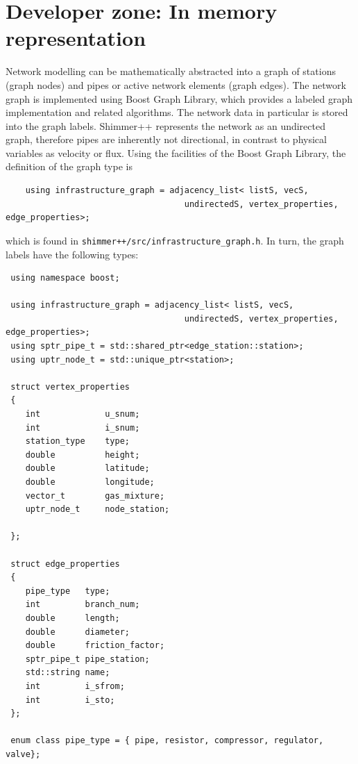 \section{Developer zone: In memory representation}
Network modelling can be mathematically abstracted into a graph of stations (graph nodes) and pipes or active network elements (graph edges). The network graph is implemented using Boost Graph Library, which provides a labeled graph implementation and related algorithms. The network data in particular is stored into the graph labels. Shimmer++ represents the network as an undirected graph, therefore pipes are inherently not directional, in contrast to physical variables as velocity or flux. Using the facilities of the Boost Graph Library, the definition of the graph type is
\begin{verbatim}
    using infrastructure_graph = adjacency_list< listS, vecS,
                                    undirectedS, vertex_properties, edge_properties>;    
\end{verbatim}    
which is found in \texttt{shimmer++/src/infrastructure\_graph.h}. In turn, the graph
labels have the following types:
\begin{verbatim}
 using namespace boost;

 using infrastructure_graph = adjacency_list< listS, vecS,
                                    undirectedS, vertex_properties, edge_properties>;
 using sptr_pipe_t = std::shared_ptr<edge_station::station>; 
 using uptr_node_t = std::unique_ptr<station>;
 
 struct vertex_properties                       
 {                                              
    int             u_snum;                     
    int             i_snum;                     
    station_type    type;                       
    double          height;                     
    double          latitude;                   
    double          longitude;                  
    vector_t        gas_mixture;                
    uptr_node_t     node_station;               
                                                  
 };

 struct edge_properties 
 {
    pipe_type   type;
    int         branch_num;
    double      length;
    double      diameter;
    double      friction_factor;
    sptr_pipe_t pipe_station;
    std::string name;
    int         i_sfrom;
    int         i_sto;          
 };  

 enum class pipe_type = { pipe, resistor, compressor, regulator,  valve};
\end{verbatim}

